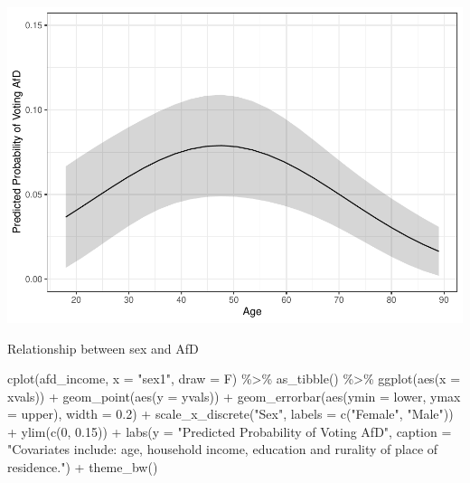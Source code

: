 \documentclass[
]{article}
\newenvironment{Shaded}{\begin{snugshade}}{\end{snugshade}}
\newcommand{\AttributeTok}[1]{\textcolor[rgb]{0.77,0.63,0.00}{#1}}
\newcommand{\DecValTok}[1]{\textcolor[rgb]{0.00,0.00,0.81}{#1}}
\newcommand{\FloatTok}[1]{\textcolor[rgb]{0.00,0.00,0.81}{#1}}
\newcommand{\FunctionTok}[1]{\textcolor[rgb]{0.00,0.00,0.00}{#1}}
\newcommand{\NormalTok}[1]{#1}
\newcommand{\SpecialCharTok}[1]{\textcolor[rgb]{0.00,0.00,0.00}{#1}}
\newcommand{\StringTok}[1]{\textcolor[rgb]{0.31,0.60,0.02}{#1}}
\begin{document}
\includegraphics{AVCD_Final_Assignment-Edenhofer_latest_files/figure-latex/afd-age-1.pdf}

Relationship between sex and AfD

\begin{Shaded}
\begin{Highlighting}[]
\FunctionTok{cplot}\NormalTok{(afd\_income, }\AttributeTok{x =} \StringTok{"sex1"}\NormalTok{, }\AttributeTok{draw =}\NormalTok{ F) }\SpecialCharTok{\%\textgreater{}\%}
  \FunctionTok{as\_tibble}\NormalTok{() }\SpecialCharTok{\%\textgreater{}\%}
  \FunctionTok{ggplot}\NormalTok{(}\FunctionTok{aes}\NormalTok{(}\AttributeTok{x =}\NormalTok{ xvals)) }\SpecialCharTok{+}
  \FunctionTok{geom\_point}\NormalTok{(}\FunctionTok{aes}\NormalTok{(}\AttributeTok{y =}\NormalTok{ yvals)) }\SpecialCharTok{+}
  \FunctionTok{geom\_errorbar}\NormalTok{(}\FunctionTok{aes}\NormalTok{(}\AttributeTok{ymin =}\NormalTok{ lower, }\AttributeTok{ymax =}\NormalTok{ upper), }\AttributeTok{width =} \FloatTok{0.2}\NormalTok{) }\SpecialCharTok{+}
  \FunctionTok{scale\_x\_discrete}\NormalTok{(}\StringTok{"Sex"}\NormalTok{, }\AttributeTok{labels =} \FunctionTok{c}\NormalTok{(}\StringTok{"Female"}\NormalTok{, }\StringTok{"Male"}\NormalTok{)) }\SpecialCharTok{+}
  \FunctionTok{ylim}\NormalTok{(}\FunctionTok{c}\NormalTok{(}\DecValTok{0}\NormalTok{, }\FloatTok{0.15}\NormalTok{)) }\SpecialCharTok{+}
  \FunctionTok{labs}\NormalTok{(}\AttributeTok{y =} \StringTok{"Predicted Probability of Voting AfD"}\NormalTok{, }
       \AttributeTok{caption =} \StringTok{"Covariates include: age, household income, education and rurality of place of residence."}\NormalTok{) }\SpecialCharTok{+}
  \FunctionTok{theme\_bw}\NormalTok{()}
\end{Highlighting}
\end{Shaded}
\end{document}
